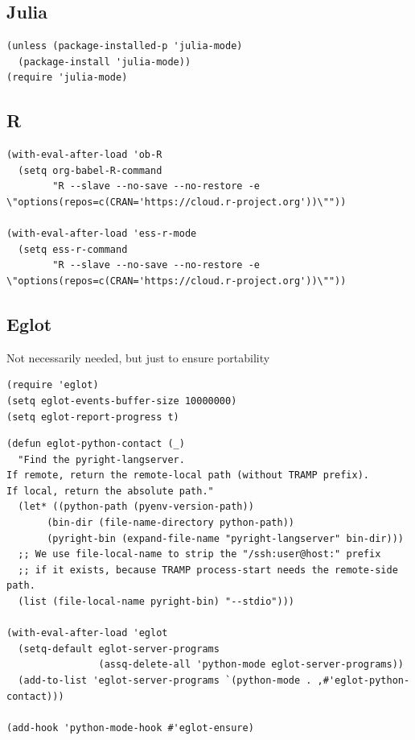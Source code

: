 \documentclass[11pt]{article}
\begin{document}
\subsection{Julia}
\label{sec:orgb2aa860}
\begin{verbatim}
(unless (package-installed-p 'julia-mode)
  (package-install 'julia-mode))
(require 'julia-mode)  
\end{verbatim}
\subsection{R}
\label{sec:orgad9484d}
\begin{verbatim}
(with-eval-after-load 'ob-R
  (setq org-babel-R-command
        "R --slave --no-save --no-restore -e \"options(repos=c(CRAN='https://cloud.r-project.org'))\""))

(with-eval-after-load 'ess-r-mode
  (setq ess-r-command
        "R --slave --no-save --no-restore -e \"options(repos=c(CRAN='https://cloud.r-project.org'))\""))  
\end{verbatim}
\subsection{Eglot}
\label{sec:org94d3261}
Not necessarily needed, but just to ensure portability
\begin{verbatim}
(require 'eglot)
(setq eglot-events-buffer-size 10000000)
(setq eglot-report-progress t)
\end{verbatim}

\begin{verbatim}
(defun eglot-python-contact (_)
  "Find the pyright-langserver. 
If remote, return the remote-local path (without TRAMP prefix).
If local, return the absolute path."
  (let* ((python-path (pyenv-version-path))
       (bin-dir (file-name-directory python-path))
       (pyright-bin (expand-file-name "pyright-langserver" bin-dir)))
  ;; We use file-local-name to strip the "/ssh:user@host:" prefix 
  ;; if it exists, because TRAMP process-start needs the remote-side path.
  (list (file-local-name pyright-bin) "--stdio")))  

(with-eval-after-load 'eglot
  (setq-default eglot-server-programs
                (assq-delete-all 'python-mode eglot-server-programs))
  (add-to-list 'eglot-server-programs `(python-mode . ,#'eglot-python-contact)))

(add-hook 'python-mode-hook #'eglot-ensure)
\end{verbatim}
\end{document}
